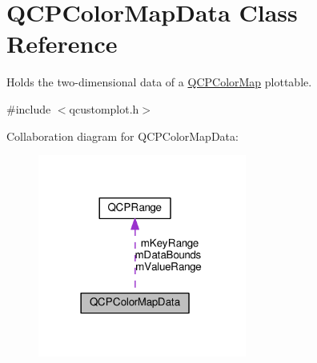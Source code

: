 \hypertarget{classQCPColorMapData}{}\section{Q\+C\+P\+Color\+Map\+Data Class Reference}
\label{classQCPColorMapData}


Holds the two-\/dimensional data of a \hyperlink{classQCPColorMap}{Q\+C\+P\+Color\+Map} plottable.  




{\ttfamily \#include $<$qcustomplot.\+h$>$}



Collaboration diagram for Q\+C\+P\+Color\+Map\+Data\+:
\nopagebreak
\begin{figure}[H]
\begin{center}
\leavevmode
\includegraphics[width=194pt]{classQCPColorMapData__coll__graph}
\end{center}
\end{figure}
